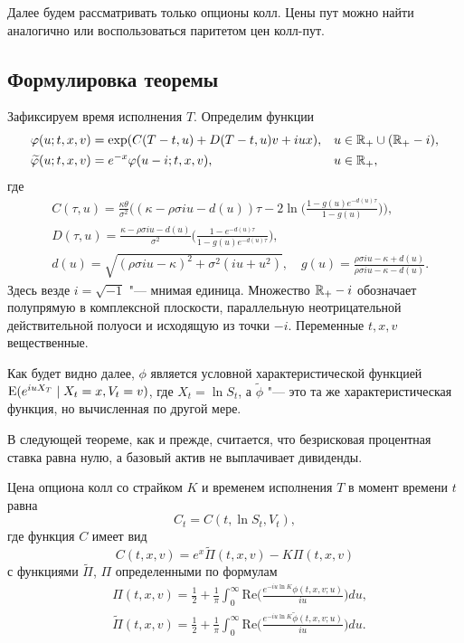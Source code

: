 Далее будем рассматривать только опционы колл.
Цены пут можно найти аналогично или воспользоваться паритетом цен колл-пут.


\subsection{Формулировка теоремы}

Зафиксируем время исполнения $T$. Определим функции
\begin{align*}
&\varphi(u;t,x,v) = \exp(C(T-t,u) + D(T-t,u)v + iu x),& &u\in\mathbb{R}_+ \cup (\mathbb{R}_+-i),\\
&\widetilde {\varphi}(u;t,x,v) = e^{-x}\varphi(u-i;t,x,v),& &u\in\mathbb{R}_+,
\end{align*}
где
\begin{align}
\label{hes:C}
&C(\tau,u) = \frac{\kappa\theta}{\sigma^2}
  \biggl(
    (\kappa- \rho\sigma iu - d(u))\tau 
    - 2\ln\biggl(\frac{1-g(u)e^{-d(u)\tau}}{1-g(u)}\biggr)
  \biggr),\\
\label{hes:D}
&D(\tau,u) = \frac{\kappa - \rho\sigma i u - d(u)}{\sigma^2}
  \biggl(\frac{1-e^{-d(u)\tau}}{1-g(u)e^{-d(u)\tau}}\biggr),\\
\label{hes:dg}
&d(u)=\sqrt{(\rho\sigma iu - \kappa)^2 + \sigma^2(iu + u^2)},\quad
  g(u) = \frac{\rho\sigma iu- \kappa +d(u)}{\rho\sigma iu - \kappa -d(u)}.
\end{align}
Здесь везде $i=\sqrt{-1}$ "--- мнимая единица. Множество $\mathbb{R}_+-i$ обозначает полупрямую в комплексной плоскости, параллельную неотрицательной действительной полуоси и исходящую из точки $-i$.
Переменные $t,x,v$ вещественные.

Как будет видно далее, $\phi$ является условной характеристической функцией $\operatorname{E} (e^{iu X_T}\mid X_t=x, V_t=v)$, где $X_t=\ln S_t$, а $\tilde \phi$ "--- это та же характеристическая функция, но вычисленная по другой мере.

В следующей теореме, как и прежде, считается, что безрисковая процентная ставка равна нулю, а базовый актив не выплачивает дивиденды.

\begin{theorem}[С.~Хестон]
\label{hes:t:formula}
Цена опциона колл со страйком $K$ и временем исполнения $T$ в момент времени $t$ равна
\begin{equation}
\label{hes:call-repr}
C_t = C(t,\ln S_t,V_t),
\end{equation}
где функция $C$ имеет вид
\begin{equation}
\label{hes:call-undiscounted}
C(t,x,v) = e^x \tilde \Pi(t,x,v) - K \Pi(t,x,v)
\end{equation}
с функциями $\tilde\Pi$, $\Pi$ определенными по формулам
\begin{align}
\label{hes:pi}
&\Pi(t,x,v) = \frac12 + \frac1\pi \int_0^\infty
  \mathrm{Re}\biggl(\frac{e^{-iu \ln K}\phi(t,x,v;u)}{iu}\biggr) du,\\[0.5em]
\label{hes:pit}
&\tilde\Pi(t,x,v) = \frac12 + \frac1\pi \int_0^\infty
  \mathrm{Re}\biggl(\frac{e^{-iu \ln K}\tilde \phi(t,x,v;u)}{iu}\biggr) du.
\end{align}
\end{theorem}

